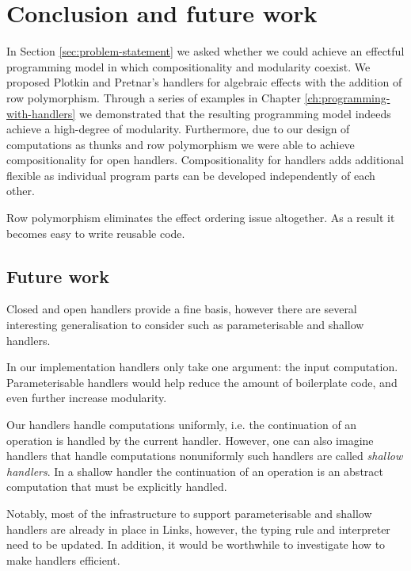 \chapter{Conclusion and future work}\label{ch:conclusion}
In Section \ref{sec:problem-statement} we asked whether we could achieve an effectful programming model in which compositionality and modularity coexist. We proposed Plotkin and Pretnar's handlers for algebraic effects \cite{Plotkin2013} with the addition of row polymorphism. Through a series of examples in Chapter \ref{ch:programming-with-handlers} we demonstrated that the resulting programming model indeeds achieve a high-degree of modularity. Furthermore, due to our design of computations as thunks and row polymorphism we were able to achieve compositionality for open handlers. Compositionality for handlers adds additional flexible as individual program parts can be developed independently of each other.

Row polymorphism eliminates the effect ordering issue altogether. As a result it becomes easy to write reusable code.

\section{Future work}
Closed and open handlers provide a fine basis, however there are several interesting generalisation to consider such as parameterisable and shallow handlers. 

In our implementation handlers only take one argument: the input computation. Parameterisable handlers would help reduce the amount of boilerplate code, and even further increase modularity. %

Our handlers handle computations uniformly, i.e. the continuation of an operation is handled by the current handler. However, one can also imagine handlers that handle computations nonuniformly such handlers are called \emph{shallow handlers}. In a shallow handler the continuation of an operation is an abstract computation that must be explicitly handled.

Notably, most of the infrastructure to support parameterisable and shallow handlers are already in place in Links, however, the typing rule and interpreter need to be updated. In addition, it would be worthwhile to investigate how to make handlers efficient.

